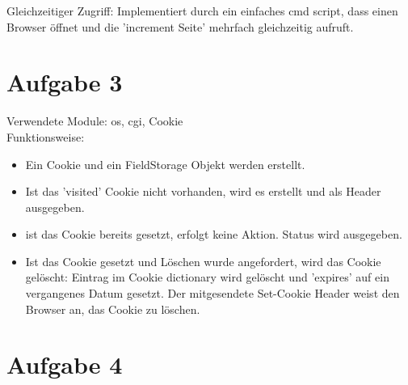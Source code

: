 \documentclass[12pt, a4paper]{report}
\begin{document}
Gleichzeitiger Zugriff:
Implementiert durch ein einfaches cmd script, dass einen Browser öffnet und die 'increment Seite' mehrfach gleichzeitig aufruft.

\section*{Aufgabe 3}
Verwendete Module: os, cgi, Cookie\\
Funktionsweise:\\
\begin{itemize}
	\item Ein Cookie und ein FieldStorage Objekt werden erstellt.
	\item Ist das 'visited' Cookie nicht vorhanden, wird es erstellt und als Header ausgegeben.
	\item ist das Cookie bereits gesetzt, erfolgt keine Aktion. Status wird ausgegeben.
	\item Ist das Cookie gesetzt und Löschen wurde angefordert, wird das Cookie gelöscht: Eintrag im Cookie dictionary wird gelöscht und 'expires' auf ein vergangenes Datum gesetzt. Der mitgesendete Set-Cookie Header weist den Browser an, das Cookie zu löschen.
\end{itemize}


\section*{Aufgabe 4}
\end{document}
